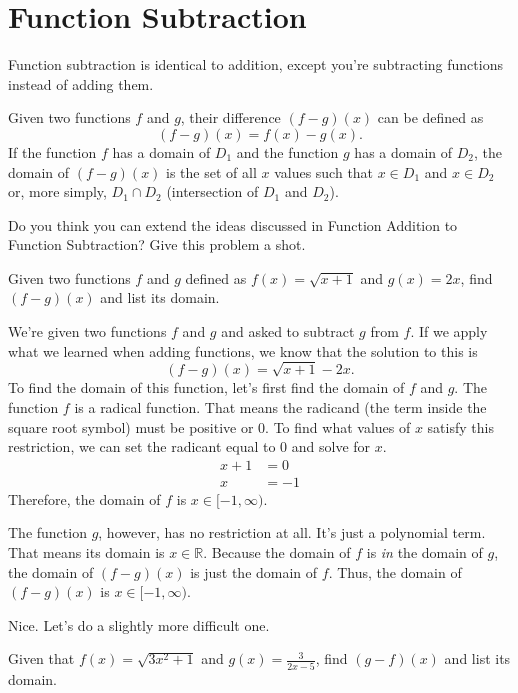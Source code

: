 \clearpage \section{Function Subtraction}
Function subtraction is identical to addition, except you're subtracting functions instead of adding them.
\begin{definition}
    Given two functions $f$ and $g$, their difference $(f - g)(x)$ can be defined as 
    \[
        (f - g)(x) = f(x) - g(x) \text{.}
    \]
    If the function $f$ has a domain of $D_1$ and the function $g$ has a domain of $D_2$, the domain of $(f - g)(x)$ is the set of all $x$ values such that $x \in D_1$ and $x \in D_2$ or, more simply, $D_1 \cap D_2$ (intersection of $D_1$ and $D_2$).
\end{definition}
Do you think you can extend the ideas discussed in Function Addition to\\Function Subtraction? Give this problem a shot.
\begin{problem}
    Given two functions $f$ and $g$ defined as $f(x) = \sqrt{x + 1}$ and $g(x) = 2x$, find $(f - g)(x)$ and list its domain.
\end{problem}
\begin{solution}
    We're given two functions $f$ and $g$ and asked to subtract $g$ from $f$. If we apply what we learned when adding functions, we know that the solution to this is
    \[
        (f - g)(x) = \sqrt{x + 1} - 2x \text{.}
    \]
    To find the domain of this function, let's first find the domain of $f$ and $g$. The function $f$ is a radical function. That means the radicand (the term inside the square root symbol) must be positive or $0$. To find what values of $x$ satisfy this restriction, we can set the radicant equal to $0$ and solve for $x$.
    \begin{align*}
        x + 1 &= 0 \\
        x &= -1
    \end{align*}
    Therefore, the domain of $f$ is $x \in [-1, \infty)$.
    
    \clearpage The function $g$, however, has no restriction at all. It's just a polynomial term. That means its domain is $x \in \mathbb{R}$. Because the domain of $f$ is \textit{in} the domain of $g$, the domain of $(f - g)(x)$ is just the domain of $f$. Thus, the domain of $(f - g)(x)$ is $x \in [-1, \infty)$.
\end{solution}
Nice. Let's do a slightly more difficult one.
\begin{problem}
    Given that $f(x) = \sqrt{3x^2 + 1}$ and $g(x) = \frac{3}{2x - 5}$, find $(g - f)(x)$ and list its domain.
\end{problem}
